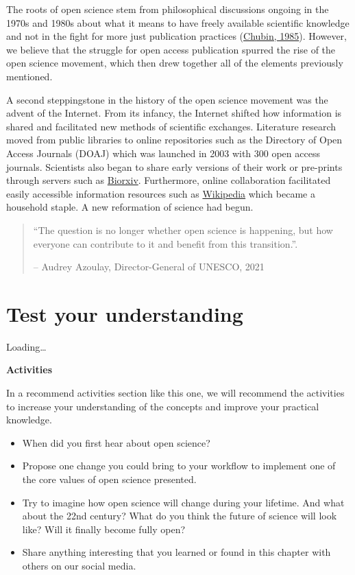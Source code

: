 \documentclass[
]{book}
\begin{document}
The roots of open science stem from philosophical discussions ongoing in the 1970s and 1980s about what it means to have freely available scientific knowledge and not in the fight for more just publication practices (\href{https://journals.sagepub.com/doi/10.1177/016224398501000211}{Chubin, 1985}). However, we believe that the struggle for open access publication spurred the rise of the open science movement, which then drew together all of the elements previously mentioned.

A second steppingstone in the history of the open science movement was the advent of the Internet. From its infancy, the Internet shifted how information is shared and facilitated new methods of scientific exchanges. Literature research moved from public libraries to online repositories such as the Directory of Open Access Journals (DOAJ) which was launched in 2003 with 300 open access journals. Scientists also began to share early versions of their work or pre-prints through servers such as \href{https://www.biorxiv.org/}{Biorxiv}. Furthermore, online collaboration facilitated easily accessible information resources such as \href{https://en.wikipedia.org/}{Wikipedia} which became a household staple. A new reformation of science had begun.

\begin{quote}
``The question is no longer whether open science is happening, but how everyone can contribute to it and benefit from this transition.''.

-- Audrey Azoulay, Director-General of UNESCO, 2021
\end{quote}

\hypertarget{test-your-understanding}{%
\section{Test your understanding}\label{test-your-understanding}}

Loading\ldots{}

\textbf{Activities}

In a recommend activities section like this one, we will recommend the activities to increase your understanding of the concepts and improve your practical knowledge.

\begin{itemize}
\item
  When did you first hear about open science?
\item
  Propose one change you could bring to your workflow to implement one of the core values of open science presented.
\item
  Try to imagine how open science will change during your lifetime. And what about the 22nd century? What do you think the future of science will look like? Will it finally become fully open?
\item
  Share anything interesting that you learned or found in this chapter with others on our social media.
\end{itemize}
\end{document}
